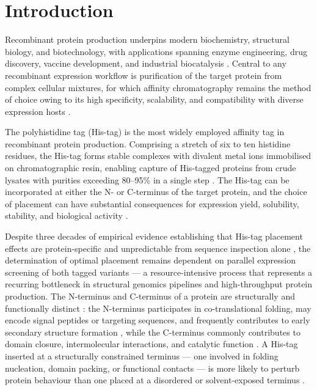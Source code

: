 \documentclass[unnumsec,webpdf,contemporary,large]{oup-authoring-template}
\begin{document}
\maketitle

\section{Introduction}

Recombinant protein production underpins modern biochemistry, structural biology, and biotechnology, with applications spanning enzyme engineering, drug discovery, vaccine development, and industrial biocatalysis \citep{burnett2020,rosano2019,overton2014}. Central to any recombinant expression workflow is purification of the target protein from complex cellular mixtures, for which affinity chromatography remains the method of choice owing to its high specificity, scalability, and compatibility with diverse expression hosts \citep{schmitt1993,li2010,bornhorst2000,zhao2013}.

The polyhistidine tag (His-tag) is the most widely employed affinity tag in recombinant protein production. Comprising a stretch of six to ten histidine residues, the His-tag forms stable complexes with divalent metal ions immobilised on chromatographic resin, enabling capture of His-tagged proteins from crude lysates with purities exceeding 80--95\% in a single step \citep{piatibratov2000,loughran2016}. The His-tag can be incorporated at either the N- or C-terminus of the target protein, and the choice of placement can have substantial consequences for expression yield, solubility, stability, and biological activity \citep{woestenenk2004,esposito2006,carson2007,kapust1999}.

Despite three decades of empirical evidence establishing that His-tag placement effects are protein-specific and unpredictable from sequence inspection alone \citep{waugh2011,terpe2003}, the determination of optimal placement remains dependent on parallel expression screening of both tagged variants --- a resource-intensive process that represents a recurring bottleneck in structural genomics pipelines and high-throughput protein production. The N-terminus and C-terminus of a protein are structurally and functionally distinct \citep{jacob2007}: the N-terminus participates in co-translational folding, may encode signal peptides or targeting sequences, and frequently contributes to early secondary structure formation \citep{netzer1997,fersht1999}, while the C-terminus commonly contributes to domain closure, intermolecular interactions, and catalytic function \citep{nooren2003,branden2012}. A His-tag inserted at a structurally constrained terminus --- one involved in folding nucleation, domain packing, or functional contacts --- is more likely to perturb protein behaviour than one placed at a disordered or solvent-exposed terminus \citep{wright1999,booth2018}.
\end{document}
